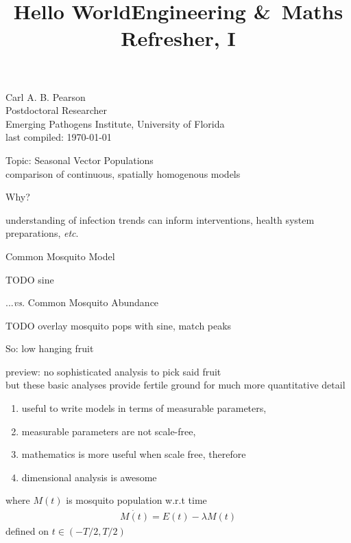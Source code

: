 \documentclass{seminar}
\begin{document}
\begin{slide}
\title{Hello World}
Carl A. B. Pearson \\
Postdoctoral Researcher \\
Emerging Pathogens Institute, University of Florida \\
last compiled: \today
\end{slide}

\begin{slide}
Topic: Seasonal Vector Populations \\
comparison of continuous, spatially homogenous models %

Why? 

understanding of infection trends can inform interventions, health system preparations, {\em etc}.
\end{slide}

\begin{slide}
Common Mosquito Model %

TODO sine
\end{slide}

\begin{slide}
...{\em vs.} Common Mosquito Abundance

TODO overlay mosquito pops with sine, match peaks
\end{slide}

\begin{slide}
So: low hanging fruit

preview: no sophisticated analysis to pick said fruit \\
but these basic analyses provide fertile ground for much more quantitative detail %
\end{slide}

\begin{slide}
\title{Engineering \&\ Maths Refresher, I}
\begin{enumerate}
\item useful to write models in terms of measurable parameters,
\item measurable parameters are not scale-free,
\item mathematics is more useful when scale free, therefore
\item dimensional analysis is awesome
\end{enumerate}
\end{slide}

\begin{slide}
where $M(t)$ is mosquito population w.r.t time
\begin{align*}
\dot{M(t)} = E(t) - \lambda M(t)
\end{align*}
defined on $t\in(-T/2,T/2)$
\end{slide}
\end{document}

